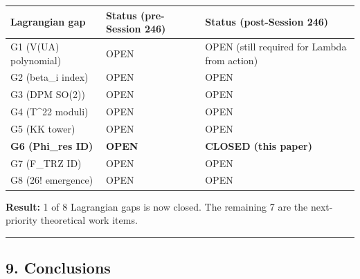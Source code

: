 \documentclass[
]{article}
\newcounter{none} %
\begin{document}
{\def\LTcaptype{none} %
\begin{longtable}[]{@{}
  >{\raggedright\arraybackslash}p{}
  >{\raggedright\arraybackslash}p{}
  >{\raggedright\arraybackslash}p{}@{}}
\toprule\noalign{}
\begin{minipage}[b]{\linewidth}\raggedright
Lagrangian gap
\end{minipage} & \begin{minipage}[b]{\linewidth}\raggedright
Status (pre-Session 246)
\end{minipage} & \begin{minipage}[b]{\linewidth}\raggedright
Status (post-Session 246)
\end{minipage} \\
\midrule\noalign{}
\endhead
\bottomrule\noalign{}
\endlastfoot
G1 (V(UA) polynomial) & OPEN & OPEN (still required for Lambda from
action) \\
G2 (beta\_i index) & OPEN & OPEN \\
G3 (DPM SO(2)) & OPEN & OPEN \\
G4 (T\^{}22 moduli) & OPEN & OPEN \\
G5 (KK tower) & OPEN & OPEN \\
\textbf{G6 (Phi\_res ID)} & \textbf{OPEN} & \textbf{CLOSED (this
paper)} \\
G7 (F\_TRZ ID) & OPEN & OPEN \\
G8 (26! emergence) & OPEN & OPEN \\
\end{longtable}
}

\textbf{Result:} 1 of 8 Lagrangian gaps is now closed. The remaining 7
are the next-priority theoretical work items.

\begin{center}\rule{0.5\linewidth}{0.5pt}\end{center}

\subsection{9. Conclusions}\label{conclusions}
\end{document}

